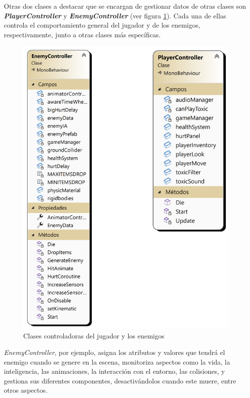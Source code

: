 Otras dos clases a destacar que se encargan de gestionar datos de otras clases son \textbf{\textit{PlayerController}} y \textbf{\textit{EnemyController}} (ver figura \ref{fig:ControladoresJugadorYEnemigo}). Cada una de ellas controla el comportamiento general del jugador y de los enemigos, respectivamente, junto a otras clases más específicas.
\begin{figure}[h]
	\centering
	\includegraphics[scale=0.45]{img/PlayerAndEnemyControllers.png}
	\caption{Clases controladoras del jugador y los enemigos}
	\label{fig:ControladoresJugadorYEnemigo}
    \end{figure}
\textit{EnemyController}, por ejemplo, asigna los atributos y valores que tendrá el enemigo cuando se genere en la escena, monitoriza aspectos como la vida, la inteligencia, las animaciones, la interacción con el entorno, las colisiones, y gestiona sus diferentes componentes, desactivándolos cuando este muere, entre otros aspectos.

